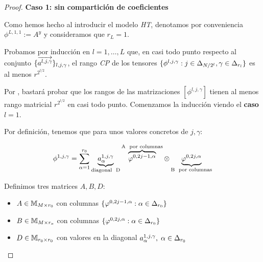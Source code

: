 \begin{teorema} \label{teorema:teorema_principal_especificacion}
\end{teorema}
\begin{proof}
    \textbf{Caso 1: sin compartición de coeficientes}

    Como hemos hecho al introducir el modelo \textit{HT}, denotamos por conveniencia $\phi^{L, 1, 1}:= A^y$ y consideramos que $r_L = 1$.

    Probamos por inducción en $l = 1, \ldots, L$ que, en casi todo punto respecto al conjunto $\{ \overrightarrow{a^{l, j, \gamma}} \}_{l, j, \gamma}$, el rango \textit{CP} de los tensores $\{ \phi^{l, j, \gamma}: j \in \Delta_{N/2^l}, \gamma \in \Delta_{r_l} \}$ es al menos $r^{2^{l/2}}$.

    Por , bastará probar que los rangos de las matrizaciones $[\phi^{l, j, \gamma}]$ tienen al menos rango matricial $r^{2^{l/2}}$ en casi todo punto. Comenzamos la inducción viendo el \textbf{caso $l = 1$}.

    Por definición, tenemos que para unos valores concretos de $j, \gamma$:

    \begin{equation}
        \phi^{1, j, \gamma} = \sum_{\alpha = 1}^{r_0} \underbrace{a_{\alpha}^{1, j, \gamma}}_\textrm{\text{diagonal } D} \overbrace{\varphi^{0, 2j - 1, \alpha}}^\textrm{A \text{ por columnas}} \otimes \underbrace{\varphi^{0, 2j, \alpha}}_\textrm{B \text{ por columnas}}
    \end{equation}

    Definimos tres matrices $A, B, D$:

    \begin{itemize}
        \item $A \in \mathbb{M}_{M \times r_0}$ con columnas $\{ \varphi^{0, 2j - 1, \alpha}: \alpha \in \Delta_{r_0} \}$
        \item $B \in \mathbb{M}_{M \times r_o}$ con columnas $\{ \varphi^{0, 2j, \alpha}: \alpha \in \Delta_{r_0} \}$
        \item $D \in \mathbb{M}_{r_0 \times r_0}$ con valores en la diagonal $a_{\alpha}^{1, j, \gamma}, \; \alpha \in \Delta_{r_0}$
    \end{itemize}


\end{proof}
